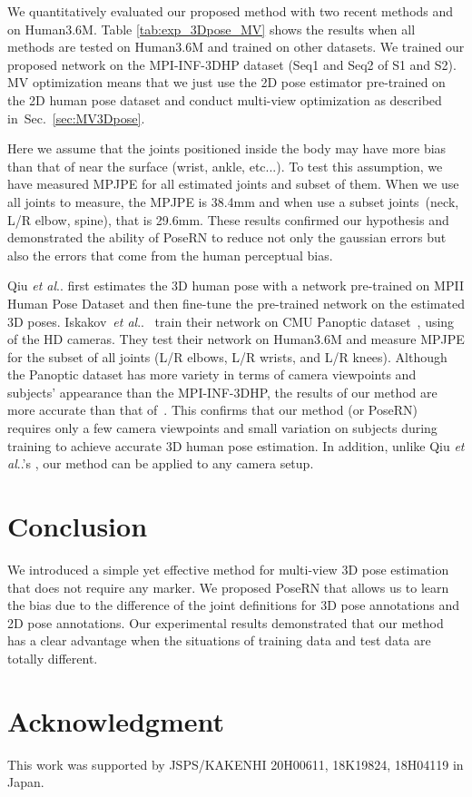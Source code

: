 \documentclass{article}
\makeatletter
\newcommand{\tabref}[1]{{Table \ref{tab:#1}}}
\newcommand{\secref}[1]{Sec.~\ref{sec:#1}}
\DeclareRobustCommand\onedot{\futurelet\@let@token\@onedot}
\def\@onedot{\ifx\@let@token.\else.\null\fi\xspace}
\def\etal{\emph{et al}\onedot}
\makeatother
\begin{document}
We quantitatively evaluated our proposed method with two recent methods \cite{iskakov2019learnable} and \cite{multiviewpose} on Human3.6M. \tabref{exp_3Dpose_MV} shows the results when all methods are tested on Human3.6M and trained on other datasets. We trained our proposed network on the MPI-INF-3DHP dataset \cite{mono-3dhp2017} (Seq1 and Seq2 of S1 and S2). 
MV optimization means that we just use the 2D pose estimator pre-trained on the 2D human pose dataset and conduct multi-view optimization as described in~\secref{MV3Dpose}. 

Here we assume that the joints positioned inside the body may have more bias than that of near the surface (wrist, ankle, etc...). To test this assumption, we have measured MPJPE for all estimated joints and subset of them. When we use all joints to measure, the MPJPE is 38.4mm and when use a subset joints~(neck, L/R elbow, spine), that is 29.6mm. 
These results confirmed our hypothesis and demonstrated the ability of PoseRN to reduce not only the gaussian errors but also the errors that come from the human perceptual bias.

Qiu \etal \cite{multiviewpose} first estimates the 3D human pose with a network pre-trained on MPII Human Pose Dataset \cite{andriluka14cvpr} and then fine-tune the pre-trained network on the estimated 3D poses. Iskakov~\etal~\cite{iskakov2019learnable} train their network on CMU Panoptic dataset~\cite{Joo2017panoptic}, using  of the  HD cameras. They test their network on Human3.6M and measure MPJPE for the subset of all joints (L/R elbows, L/R wrists, and L/R knees). Although the Panoptic dataset has more variety in terms of camera viewpoints and subjects' appearance than the MPI-INF-3DHP, the results of our method are more accurate than that of~\cite{iskakov2019learnable}. This confirms that our method (or PoseRN) requires only a few camera viewpoints and small variation on subjects during training to achieve accurate 3D human pose estimation. In addition, unlike Qiu \etal's \cite{multiviewpose}, our method can be applied to any camera setup. 

\vspace{-0.2cm}
\section{Conclusion}\label{conclusion}
\vspace{-0.2cm}
We introduced a simple yet effective method for multi-view 3D pose estimation that does not require any marker. 
We proposed PoseRN that allows us to learn the bias due to the difference of the joint definitions for 3D pose annotations and 2D pose annotations. 
Our experimental results demonstrated that our method has a clear advantage when the situations of training data and test data are totally different. 

\vspace{-0.4cm}
\section*{\centering \large Acknowledgment}
\vspace{-0.3cm}
This work was supported by JSPS/KAKENHI 20H00611, 18K19824, 18H04119 in Japan.
\vspace{-0.4cm}



\end{document}
